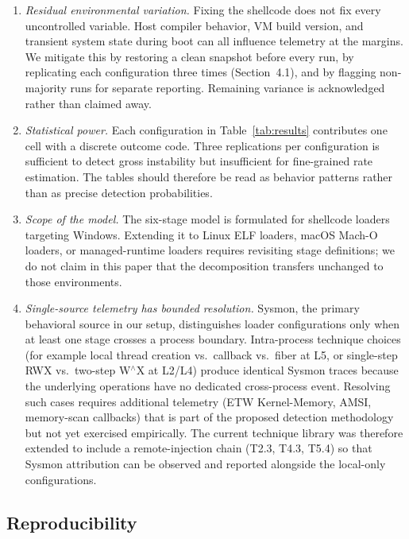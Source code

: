 \begin{enumerate}[leftmargin=*, itemsep=2pt]
    \item \textit{Residual environmental variation.}
    Fixing the shellcode does not fix every uncontrolled variable.
    Host compiler behavior, VM build version, and transient system state during boot can all influence telemetry at the margins.
    We mitigate this by restoring a clean snapshot before every run, by replicating each configuration three times (Section~4.1), and by flagging non-majority runs for separate reporting.
    Remaining variance is acknowledged rather than claimed away.

    \item \textit{Statistical power.}
    Each configuration in Table~\ref{tab:results} contributes one cell with a discrete outcome code.
    Three replications per configuration is sufficient to detect gross instability but insufficient for fine-grained rate estimation.
    The tables should therefore be read as behavior patterns rather than as precise detection probabilities.

    \item \textit{Scope of the model.}
    The six-stage model is formulated for shellcode loaders targeting Windows.
    Extending it to Linux ELF loaders, macOS Mach-O loaders, or managed-runtime loaders requires revisiting stage definitions; we do not claim in this paper that the decomposition transfers unchanged to those environments.

    \item \textit{Single-source telemetry has bounded resolution.}
    Sysmon, the primary behavioral source in our setup, distinguishes loader configurations only when at least one stage crosses a process boundary.
    Intra-process technique choices (for example local thread creation vs.\ callback vs.\ fiber at L5, or single-step RWX vs.\ two-step W$^{\wedge}$X at L2/L4) produce identical Sysmon traces because the underlying operations have no dedicated cross-process event.
    Resolving such cases requires additional telemetry (ETW Kernel-Memory, AMSI, memory-scan callbacks) that is part of the proposed detection methodology but not yet exercised empirically.
    The current technique library was therefore extended to include a remote-injection chain (T2.3, T4.3, T5.4) so that Sysmon attribution can be observed and reported alongside the local-only configurations.
\end{enumerate}

\subsection{Reproducibility}

